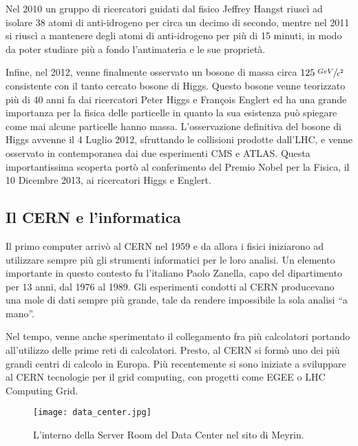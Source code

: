 			Nel 2010 un gruppo di ricercatori guidati dal fisico Jeffrey Hangst riuscì ad isolare 38 atomi di anti-idrogeno per circa un decimo di secondo, mentre nel 2011 si riuscì a mantenere degli atomi di anti-idrogeno per più di 15 minuti, in modo da poter studiare più a fondo l'antimateria e le sue proprietà.
			
			Infine, nel 2012, venne finalmente osservato un bosone di massa circa $125 \; \sfrac{GeV}{c^2}$ consistente con il tanto cercato bosone di Higgs. Questo bosone venne teorizzato più di 40 anni fa dai ricercatori Peter Higgs e François Englert ed ha una grande importanza per la fisica delle particelle in quanto la sua esistenza può spiegare come mai alcune particelle hanno massa. L'osservazione definitiva del bosone di Higgs avvenne il 4 Luglio 2012, sfruttando le collisioni prodotte dall'\ac{LHC}, e venne osservato in contemporanea dai due esperimenti \ac{CMS} e \ac{ATLAS}. Questa importantissima scoperta portò al conferimento del Premio Nobel per la Fisica, il 10 Dicembre 2013, ai ricercatori Higgs e Englert.
			
		\subsection{Il CERN e l'informatica} \label{subsec:C;s;informatica}
		
			Il primo computer arrivò al \ac{CERN} nel 1959 e da allora i fisici iniziarono ad utilizzare sempre più gli strumenti informatici per le loro analisi. Un elemento importante in questo contesto fu l'italiano Paolo Zanella, capo del dipartimento  per 13 anni, dal 1976 al 1989. Gli esperimenti condotti al \ac{CERN} producevano una mole di dati sempre più grande, tale da rendere impossibile la sola analisi ``a mano''.
			
			Nel tempo, venne anche sperimentato il collegamento fra più calcolatori portando all'utilizzo delle prime reti di calcolatori. Presto, al \ac{CERN} si formò uno dei più grandi centri di calcolo in Europa. Più recentemente si sono iniziate a sviluppare al \ac{CERN} tecnologie per il grid computing, con progetti come \ac{EGEE} o LHC Computing Grid.
			
			\begin{figure}[h!]
				\begin{center}
					\texttt{[image: data\_center.jpg]}
				\end{center}
				\caption[Server Room del Data Center]{L'interno della Server Room del Data Center nel sito di Meyrin.}
				\label{fig:data_center}
			\end{figure}
			
